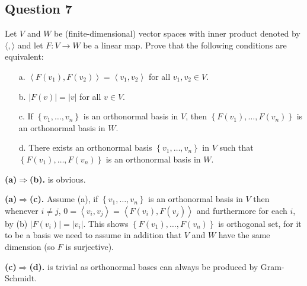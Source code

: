 \documentclass[12pt]{article}
\begin{document}
\subsection*{Question 7}

\newcommand*{\inner}[1]{\left\langle #1 \right\rangle}
\newcommand*{\set}[1]{\left\{ #1 \right\}}
\newcommand*{\abs}[1]{\left\lvert #1 \right\rvert}

Let \(V\) and \(W\) be (finite-dimensional) vector spaces with inner product denoted by \(\langle,\rangle\)
and let \(F:V\to W\) be a linear map.
Prove that the following conditions are equivalent:
\begin{enumerate}
    \item[a.] \(\inner{F(v_1),F(v_2) } = \inner{v_1,v_2}\) for all \(v_1,v_2\in V\).
    \item[b.] \(\abs{ F(v) } = \abs{ v}\) for all \(v\in V\).
    \item[c.] If \(\set{v_1,\dots,v_n}\) is an orthonormal basis in \(V\), then \(\set{F(v_1),\dots,F(v_n)}\) is an orthonormal basis in \(W\).
    \item[d.] There exists an orthonormal basis \(\set{v_1,\dots,v_n}\) in \(V\) such that \(\set{F(v_1),\dots,F(v_n)}\) is an orthonormal basis in \(W\).
\end{enumerate}

\textbf{(a)$\Rightarrow$(b).} is obvious.

\textbf{(a)$\Rightarrow$(c).} Assume (a), if \(\set{v_1,\dots,v_n}\) is an orthonormal basis in \(V\) then whenever \(i\ne j\),
\(0 = \inner{v_i,v_j} = \inner{F(v_i),F(v_j)}\) and furthermore for each \(i\), by (b) \(\abs{F(v_i)} = \abs{v_i}\).
This shows \(\set{F(v_1),\dots,F(v_n)}\) is orthogonal set, for it to be a basis we need to assume in addition that \(V\) and \(W\) have the same dimension (so \(F\) is surjective).

\textbf{(c)$\Rightarrow$(d).} is trivial as orthonormal bases can always be produced by Gram-Schmidt.
\end{document}
